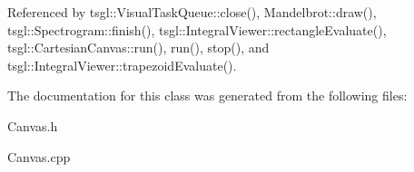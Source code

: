 Referenced by tsgl\+::\+Visual\+Task\+Queue\+::close(), Mandelbrot\+::draw(), tsgl\+::\+Spectrogram\+::finish(), tsgl\+::\+Integral\+Viewer\+::rectangle\+Evaluate(), tsgl\+::\+Cartesian\+Canvas\+::run(), run(), stop(), and tsgl\+::\+Integral\+Viewer\+::trapezoid\+Evaluate().



The documentation for this class was generated from the following files\+:\begin{DoxyCompactItemize}
\item 
Canvas.\+h\item 
Canvas.\+cpp\end{DoxyCompactItemize}

